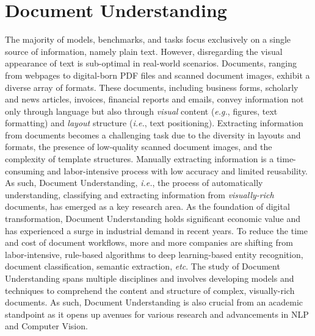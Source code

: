 \chapter{Document Understanding}
\label{chapter:related-document-understanding}


\renewcommand{\leftmark}{\spacedlowsmallcaps{Document Understanding}}


\minitoc


The majority of models, benchmarks, and tasks focus exclusively on a single source of information, namely plain text. However, disregarding the visual appearance of text is sub-optimal in real-world scenarios. Documents, ranging from webpages to digital-born PDF files and scanned document images, exhibit a diverse array of formats. These documents, including business forms, scholarly and news articles, invoices, financial reports and emails, convey information not only through language but also through \textit{visual} content (\textit{e.g.}, figures, text formatting) and \textit{layout} structure (\textit{i.e.}, text positioning). Extracting information from documents becomes a challenging task due to the diversity in layouts and formats, the presence of low-quality scanned document images, and the complexity of template structures. Manually extracting information is a time-consuming and labor-intensive process with low accuracy
and limited reusability. As such, Document Understanding, \textit{i.e.}, the process of automatically understanding, classifying and extracting information from \textit{visually-rich} documents, has emerged as a key research area. As the foundation of digital transformation, Document Understanding holds significant economic value and has experienced a surge in industrial demand in recent years. To reduce the time and cost of document workflows, more and more companies are shifting from labor-intensive, rule-based algorithms to deep learning-based entity recognition, document classification, semantic extraction, \textit{etc}. The study of Document Understanding spans multiple disciplines and involves developing models and techniques to comprehend the content and structure of complex, visually-rich documents. As such, Document Understanding is also crucial from an academic standpoint as it opens up avenues for various research and advancements in \ac{NLP} and Computer Vision. 

